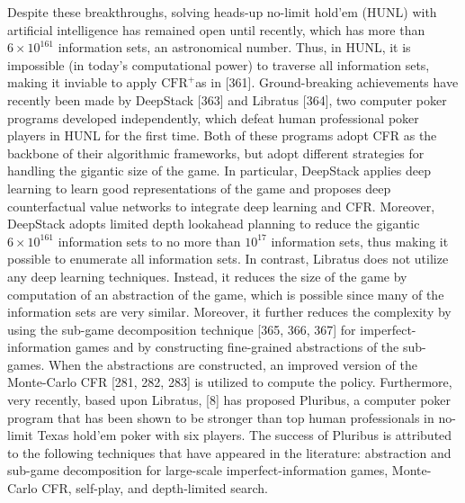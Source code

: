\documentclass[10pt]{article}
\begin{document}
Despite these breakthroughs, solving heads-up no-limit hold'em (HUNL) with artificial intelligence has remained open until recently, which has more than $6 \times 10^{161}$ information sets, an astronomical number. Thus, in HUNL, it is impossible (in today's computational power) to traverse all information sets, making it inviable to apply $\mathrm{CFR}^{+}$as in [361]. Ground-breaking achievements have recently been made by DeepStack [363] and Libratus [364], two computer poker programs developed independently, which defeat human professional poker players in HUNL for the first time. Both of these programs adopt CFR as the backbone of their algorithmic frameworks, but adopt different strategies for handling the gigantic size of the game. In particular, DeepStack applies deep learning to learn good representations of the game and proposes deep counterfactual value networks to integrate deep learning and CFR. Moreover, DeepStack adopts limited depth lookahead planning to reduce the gigantic $6 \times 10^{161}$ information sets to no more than $10^{17}$ information sets, thus making it possible to enumerate all information sets. In contrast, Libratus does not utilize any deep learning techniques. Instead, it reduces the size of the game by computation of an abstraction of the game, which is possible since many of the information sets are very similar. Moreover, it further reduces the complexity by using the sub-game decomposition technique [365, 366, 367] for imperfect-information games and by constructing fine-grained abstractions of the sub-games. When the abstractions are constructed, an improved version of the Monte-Carlo CFR [281, 282, 283] is utilized to compute the policy. Furthermore, very recently, based upon Libratus, [8] has proposed Pluribus, a computer poker program that has been shown to be stronger than top human professionals in no-limit Texas hold'em poker with six players. The success of Pluribus is attributed to the following techniques that have appeared in the literature: abstraction and sub-game decomposition for large-scale imperfect-information games, Monte-Carlo CFR, self-play, and depth-limited search.
\end{document}
